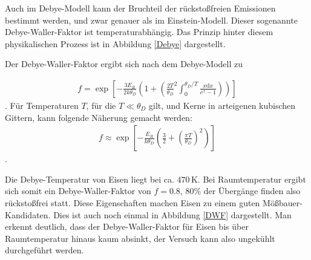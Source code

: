 {

Auch im Debye-Modell kann der Bruchteil der rückstoßfreien Emissionen bestimmt werden, und zwar genauer als im Einstein-Modell. Dieser sogenannte Debye-Waller-Faktor ist temperaturabhängig. Das Prinzip hinter diesem physikalischen Prozess ist in Abbildung \ref{Debye} dargestellt.


Der Debye-Waller-Faktor ergibt sich nach dem Debye-Modell zu

\begin{align}
f = \exp\left[ -\frac{3E_R}{2k\theta_D}\left( 1+\left( \frac{2T}{\theta_D}^2 \int_{0}^{\theta_D/T}\frac{x\mathrm{d}x}{e^x-1}\right) \right) \right]
\end{align}.
Für Temperaturen $T$, für die $T \ll \theta_D$ gilt, und Kerne in arteigenen kubischen Gittern, kann folgende Näherung gemacht werden:
\begin{align}
f\approx \exp\left[ -\frac{E_R}{k\theta_D} \left(\frac{3}{2} + \left(\frac{\pi T}{\theta_D}\right)^2 \right) \right]
\end{align}.

Die Debye-Temperatur von Eisen liegt bei ca. $470 \,\mathrm{K}$. Bei Raumtemperatur ergibt sich somit ein Debye-Waller-Faktor von $f=0.8$, 80\% der Übergänge finden also rückstoßfrei statt. Diese Eigenschaften machen Eisen zu einem guten Mößbauer-Kandidaten. Dies ist auch noch einmal in Abbildung \ref{DWF} dargestellt. Man erkennt deutlich, dass der Debye-Waller-Faktor für Eisen bis über Raumtemperatur hinaus kaum absinkt, der Versuch kann also ungekühlt durchgeführt werden.

}
